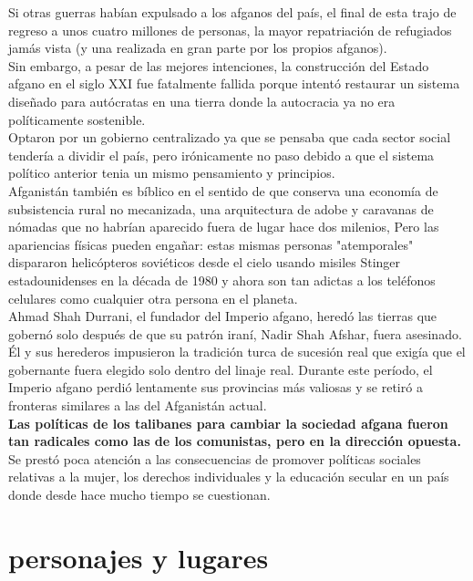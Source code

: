 \documentclass[10pt]{book}
\begin{document}
 Si otras guerras habían expulsado a los afganos del país, el final de esta trajo de regreso a unos cuatro millones de personas, la mayor repatriación de refugiados jamás vista (y una realizada en gran parte por los propios afganos).\\
  Sin embargo, a pesar de las mejores intenciones, la construcción del Estado afgano en el siglo XXI fue fatalmente fallida porque intentó restaurar un sistema diseñado para autócratas en una tierra donde la autocracia ya no era políticamente sostenible.\\
Optaron por un gobierno centralizado ya que se pensaba que cada sector social tendería a dividir el país, pero irónicamente no paso debido a que el sistema político anterior tenia un mismo pensamiento y principios.\\
Afganistán también es bíblico en el sentido de que conserva una economía de subsistencia rural no mecanizada, una arquitectura de adobe y caravanas de nómadas que no habrían aparecido fuera de lugar hace dos milenios, Pero las apariencias físicas pueden engañar: estas mismas personas "atemporales" dispararon helicópteros soviéticos desde el cielo usando misiles Stinger estadounidenses en la década de 1980 y ahora son tan adictas a los teléfonos celulares como cualquier otra persona en el planeta.\\
Ahmad Shah Durrani, el fundador del Imperio afgano, heredó las tierras que gobernó solo después de que su patrón iraní, Nadir Shah Afshar, fuera asesinado. Él y sus herederos impusieron la tradición turca de sucesión real que exigía que el gobernante fuera elegido solo dentro del linaje real. Durante este período, el Imperio afgano perdió lentamente sus provincias más valiosas y se retiró a fronteras similares a las del Afganistán actual.\\
\textbf{Las políticas de los talibanes para cambiar la sociedad afgana fueron tan radicales como las de los comunistas, pero en la dirección opuesta. }\\
Se prestó poca atención a las consecuencias de promover políticas sociales relativas a la mujer, los derechos individuales y la educación secular en un país donde desde hace mucho tiempo se cuestionan.

\chapter{personajes y lugares}
\end{document}
